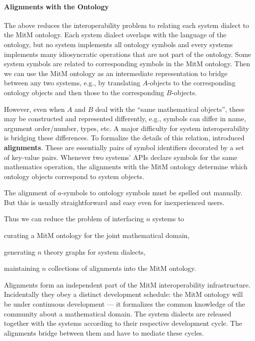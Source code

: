 
\paragraph{Alignments with the Ontology}
The above reduces the interoperability problem to relating each system dialect to the MitM ontology.
Each system dialect overlaps with the language of the ontology, but no system implements all ontology symbols and every systems implements many idiosyncratic operations that are not part of the ontology.
Some system symbols are related to corresponding symbols in the MitM ontology. Then we can use the MitM ontology as an intermediate representation to bridge between any two systems, e.g., by translating $A$-objects to the corresponding ontology objects and then those to the corresponding $B$-objects.

However, even when $A$ and $B$ deal with the ``same mathematical objects'', these may be constructed and represented differently, e.g., symbols can differ in name,
argument order/number, types, etc.
A major difficulty for system interoperability is bridging these differences.
To formalize the details of this relation, \cite{MueGauKal:cacfms17} introduced \textbf{\OMMT alignments}.
These are essentially pairs of \OMMT symbol identifiers decorated by a set of key-value pairs.
Whenever two systems' APIs declare symbols for the same mathematics operation, the alignments with the MitM ontology determine which ontology objects correspond to system objects.

The alignment of $a$-symbols to ontology symbols must be spelled out manually.
But this is usually straightforward and easy even for inexperienced users.

Thus we can reduce the problem of interfacing $n$ systems to
\begin{inparaenum}[\em i\rm)]
\item curating a MitM ontology for the joint mathematical domain,
\item generating $n$ theory graphs for system dialects,
\item maintaining $n$ collections of alignments into the MitM ontology.
\end{inparaenum}

Alignments form an independent part of the MitM interoperability infrastructure.
Incidentally they obey a distinct development schedule: the MitM ontology will be under continuous development --- it formalizes the common knowledge of the community about a mathematical domain.
The system dialects are released together with the systems according to their respective development cycle.
The alignments bridge between them and have to mediate these cycles.


